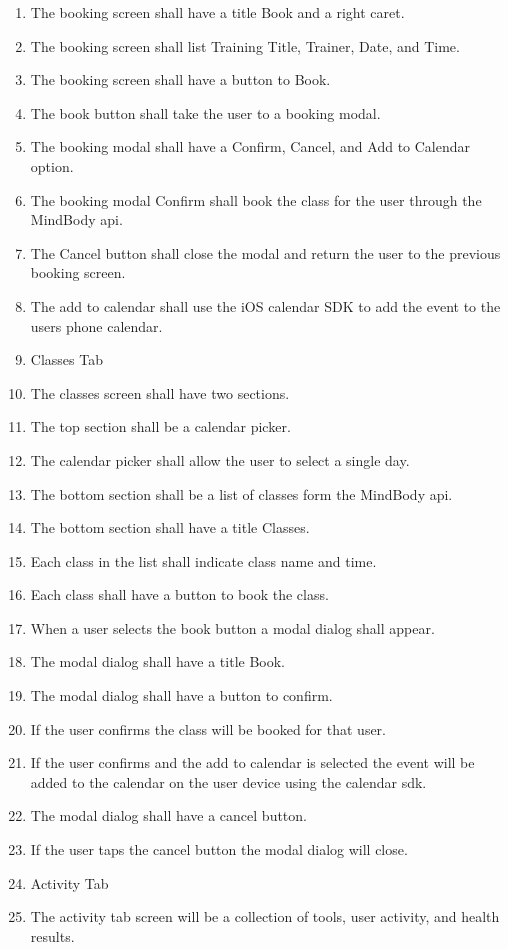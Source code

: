 \documentclass[letterpaper,10pt,titlepage]{article}
\begin{document}
\begin{enumerate}
\item The booking screen shall have a title Book and a right caret.
\item The booking screen shall list Training Title, Trainer, Date, and Time.
\item The booking screen shall have a button to Book.
\item The book button shall take the user to a booking modal.
\item The booking modal shall have a Confirm, Cancel, and Add to Calendar option.
\item The booking modal Confirm shall book the class for the user through the MindBody api.
\item The Cancel button shall close the modal and return the user to the previous booking screen.
\item The add to calendar shall use the iOS calendar SDK to add the event to the users phone calendar.
\item Classes Tab
\item The classes screen shall have two sections.
\item The top section shall be a calendar picker.
\item The calendar picker shall allow the user to select a single day.
\item The bottom section shall be a list of classes form the MindBody api.
\item The bottom section shall have a title Classes.
\item Each class in the list shall indicate class name and time.
\item Each class shall have a button to book the class.
\item When a user selects the book button a modal dialog shall appear.
\item The modal dialog shall have a title Book.
\item The modal dialog shall have a button to confirm.
\item If the user confirms the class will be booked for that user.
\item If the user confirms and the add to calendar is selected the event will be added to the calendar on the user device using the calendar sdk.
\item The modal dialog shall have a cancel button.
\item If the user taps the cancel button the modal dialog will close.
\item Activity Tab
\item The activity tab screen will be a collection of tools, user activity, and health results.

\end{enumerate}
\end{document}
